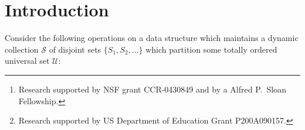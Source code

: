 \documentclass[11pt]{article}
\title{\probs}
\author{John Iacono\thanks{Research supported by NSF grant CCR-0430849 and by a Alfred P.~Sloan Fellowship.} 
\and
\"Ozg\"ur \"Ozkan\thanks{Research supported by US Department of Education Grant P200A090157.}
}
\date{Department of Computer Science and Engineering\\ Polytechnic Institute of NYU\\2 MetroTech Center\\Brooklyn, NY 11201-3840 USA}
\newcommand{\Ds}{Mergeable Dictionary}
\newcommand{\kwSpl}{Split}
\newcommand{\kwUnion}{Merge}
\newcommand{\universe}{\ensuremath{\mathcal U}}
\newcommand{\set}[1]{\ensuremath{#1}}
\newcommand{\collection}[1]{\ensuremath{\mathcal #1}}
\newcommand{\op}[1]{#1}
\begin{document}
\maketitle

\begin{abstract} 
A data structure is presented for the \Ds{} abstract data type, which supports the following operations on a collection of disjoint sets of totally ordered data: 
\op{Predecessor-Search}, \op{\kwSpl} and \op{\kwUnion}. While \op{Predecessor-Search} and \op{\kwSpl} work in the normal way, the novel operation is \op{\kwUnion}. While in a typical mergeable dictionary (e.g.~2-4 Trees), the \op{\kwUnion} operation can only be performed on sets that span disjoint intervals in keyspace, the structure here has no such limitation, and permits the merging of arbitrarily interleaved sets. 
Tarjan and Brown present a data structure~\cite{journals/jacm/BrownT79} which can handle arbitrary \op{\kwUnion} operations in $\mathcal O(\log n)$ amortized time per operation if the set of operations is restricted to exclude the \op{\kwSpl} operation. In the presence of \op{\kwSpl} operations, the amortized time complexity of their structure becomes $\Omega(n)$. A data structure which supports both \op{\kwSpl} and \op{\kwUnion} operations in $\mathcal O(\log^2 n)$ amortized time per operation was given by Farach and Thorup~\cite{journals/algorithmica/FarachT98}. 
In contrast, our data structure supports all operations, including \op{\kwSpl} and \op{\kwUnion}, in $O(\log n)$ amortized time, thus showing that interleaved \op{\kwUnion} operations can be supported at no additional cost vis-\`{a}-vis disjoint \op{\kwUnion} operations.
\end{abstract}







\section{Introduction} 

Consider the following operations on a data structure which maintains a dynamic collection \collection S of disjoint sets $\{\set{S_1}, \set{S_2}, \ldots\}$ which partition some totally ordered universal set \universe: 
\end{document}
